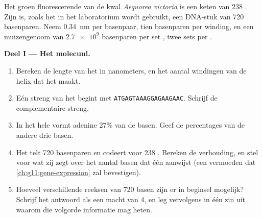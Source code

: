 \begin{problem}
\label{pb:g10:universal-dna:1}
Het groen fluorescerende  van de kwal \emph{Aequorea victoria} is
een keten van 238 . Zijn  is, zoals het in het laboratorium
wordt gebruikt, een DNA-stuk van 720 basenparen. Neem \qty{0.34}{nm} per
basenpaar, tien basenparen per winding, en een muizengenoom van
$\num{2.7e9}$ basenparen per set , twee sets per .

\medskip
\noindent\textbf{Deel I --- Het molecuul.}
\begin{enumerate}
  \item Bereken de lengte van het  in nanometers, en het aantal
        windingen van de helix dat het maakt.
  \item Eén streng van het  begint met
        \texttt{ATGAGTAAAGGAGAAGAAC}. Schrijf de complementaire streng.
  \item In het hele  vormt adenine 27\% van de basen. Geef de
        percentages van de andere drie basen.
  \item Het  telt 720 basenparen en codeert voor 238 .
        Bereken de verhouding, en stel voor wat zij zegt over het aantal
        basen dat één  aanwijst (een vermoeden dat
        \cref{ch:g11:gene-expression} zal bevestigen).
  \item Hoeveel verschillende reeksen van 720 basen zijn er in beginsel
        mogelijk? Schrijf het antwoord als een macht van 4, en leg
        vervolgens in één zin uit waarom die volgorde informatie mag
        heten.
\end{enumerate}


\end{problem}
